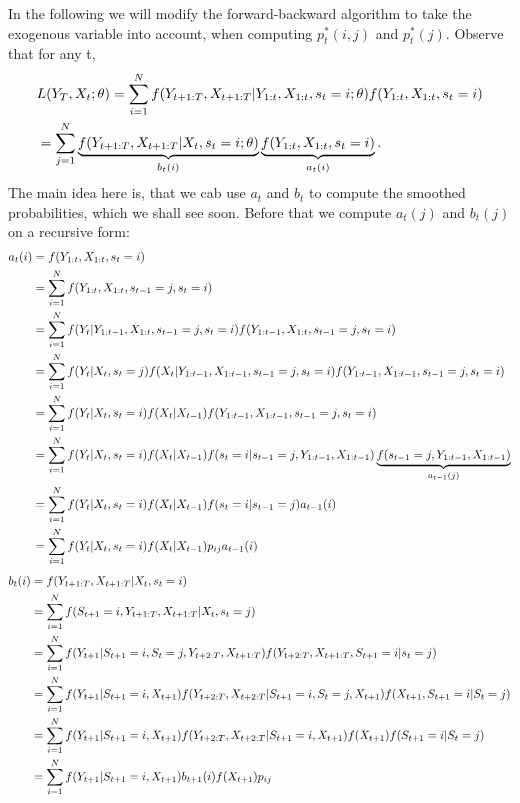 \documentclass[11pt,a4paper,oneside]{article}
\begin{document}
\noindent In the following we will modify the forward-backward algorithm to take the exogenous variable into account, when computing $p_t^*(i,j)$ and $p_t^*(j)$. Observe that for any t,
\begin{align}
    &L(Y_T,X_t;\theta)=\sum_{i=1}^{N}f(Y_{t+1:T},X_{t+1:T}\vert Y_{1:t},X_{1:t},s_t=i;\theta)f(Y_{1:t},X_{1:t},s_t=i) \notag \\
    &=\sum_{j=1}^{N}\underbrace{f(Y_{t+1:T},X_{t+1:T}\vert X_t,s_t=i;\theta)}_{b_t(i)}\underbrace{f(Y_{1:t},X_{1:t},s_t=i)}_{a_t(i)}.
\end{align}
The main idea here is, that we cab use $a_t$ and $b_t$ to compute the smoothed probabilities, which we shall see soon. Before that we compute $a_t(j)$ and $b_t(j)$ on a recursive form:
\begin{align}
    a_t(i)&=f(Y_{1:t},X_{1:t},s_t=i) \notag \\
          &=\sum_{i=1}^{N}f(Y_{1:t},X_{1:t},s_{t-1}=j,s_t=i) \notag \\
          &=\sum_{i=1}^{N}f(Y_t \vert Y_{1:t-1},X_{1:t},s_{t-1}=j,s_t=i)f( Y_{1:t-1},X_{1:t},s_{t-1}=j,s_t=i) \notag \\
          &=\sum_{i=1}^{N}f(Y_t \vert X_t,s_t=j)f(X_t \vert Y_{1:t-1},X_{1:t-1},s_{t-1}=j,s_t=i)f(Y_{1:t-1},X_{1:t-1},s_{t-1}=j,s_t=i) \notag \\
          &=\sum_{i=1}^{N}f(Y_t \vert X_t,s_t=i)f(X_t \vert X_{t-1})f(Y_{1:t-1},X_{1:t-1},s_{t-1}=j,s_t=i) \notag \\
          &=\sum_{i=1}^{N}f(Y_t \vert X_t,s_t=i)f(X_t \vert X_{t-1})f(s_t=i\vert s_{t-1}=j,Y_{1:t-1},X_{1:t-1})\underbrace{f(s_{t-1}=j,Y_{1:t-1},X_{1:t-1})}_{a_{t-1}(j)} \notag \\
          &=\sum_{i=1}^{N}f(Y_t \vert X_t,s_t=i)f(X_t \vert X_{t-1})f(s_t=i\vert s_{t-1}=j)a_{t-1}(i) \notag \\
          &=\sum_{i=1}^{N}f(Y_t \vert X_t,s_t=i)f(X_t \vert X_{t-1})p_{ij}a_{t-1}(i)
\end{align}
\begin{align}
    b_t(i)&=f(Y_{t+1:T},X_{t+1:T}\vert X_t,s_t=i) \notag \\
          &=\sum_{i=1}^{N}f(S_{t+1}=i,Y_{t+1:T},X_{t+1:T}\vert X_t,s_t=j) \notag \\
          &=\sum_{i=1}^{N}f(Y_{t+1}\vert S_{t+1}=i,S_t=j,Y_{t+2:T},X_{t+1:T})f(Y_{t+2:T},X_{t+1:T},S_{t+1}=i\vert s_t=j) \notag \\
          &=\sum_{i=1}^{N}f(Y_{t+1}\vert S_{t+1}=i,X_{t+1})f(Y_{t+2:T},X_{t+2:T}\vert S_{t+1}=i,S_t=j,X_{t+1})f(X_{t+1},S_{t+1}=i\vert S_t=j) \notag \\
          &=\sum_{i=1}^{N}f(Y_{t+1}\vert S_{t+1}=i,X_{t+1})f(Y_{t+2:T},X_{t+2:T}\vert S_{t+1}=i,X_{t+1})f(X_{t+1})f(S_{t+1}=i\vert S_t=j) \notag \\
          &=\sum_{i=1}^{N}f(Y_{t+1}\vert S_{t+1}=i,X_{t+1})b_{t+1}(i)f(X_{t+1})p_{ij}
\end{align}
\end{document}
